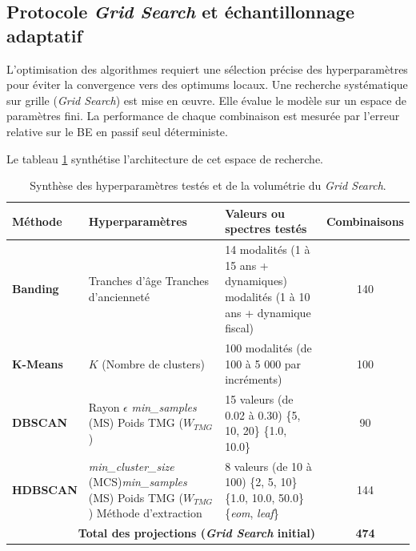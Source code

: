 \subsection{Protocole \textit{Grid Search} et échantillonnage adaptatif}

L'optimisation des algorithmes requiert une sélection précise des hyperparamètres pour éviter la convergence vers des optimums locaux. Une recherche systématique sur grille (\textit{Grid Search}) est mise en œuvre. Elle évalue le modèle sur un espace de paramètres fini. La performance de chaque combinaison est mesurée par l'erreur relative sur le BE en passif seul déterministe.

Le tableau \ref{tab:grid_search_params} synthétise l'architecture de cet espace de recherche.

\begin{table}[H]
    \centering
    \footnotesize
    \begin{tabular}{|l|p{4cm}|p{6cm}|c|}
        \hline
        \textbf{Méthode} & \textbf{Hyperparamètres} & \textbf{Valeurs ou spectres testés} & \textbf{Combinaisons} \\
        \hline
        \textbf{Banding} & Tranches d'âge \newline Tranches d'ancienneté & 14 modalités (1 à 15 ans + dynamiques) \newline 10 modalités (1 à 10 ans + dynamique fiscal) & 140 \\
        \hline
        \textbf{K-Means} & $K$ (Nombre de clusters) & 100 modalités (de 100 à 5 000 par incréments) & 100 \\
        \hline
        \textbf{DBSCAN} & Rayon $\epsilon$ \newline \textit{min\_samples} (MS) \newline Poids TMG ($W_{TMG}$) & 15 valeurs (de 0.02 à 0.30) \newline \{5, 10, 20\} \newline \{1.0, 10.0\} & 90 \\
        \hline
        \textbf{HDBSCAN} & \textit{min\_cluster\_size} (MCS)\newline \textit{min\_samples} (MS) \newline Poids TMG ($W_{TMG}$) \newline Méthode d'extraction & 8 valeurs (de 10 à 100) \newline \{2, 5, 10\} \newline \{1.0, 10.0, 50.0\} \newline \{\textit{eom}, \textit{leaf}\} & 144 \\
        \hline
        \multicolumn{3}{|r|}{\textbf{Total des projections (\textit{Grid Search} initial)}} & \textbf{474} \\
        \hline
    \end{tabular}
    \caption{Synthèse des hyperparamètres testés et de la volumétrie du \textit{Grid Search}.}
    \label{tab:grid_search_params}
\end{table}

